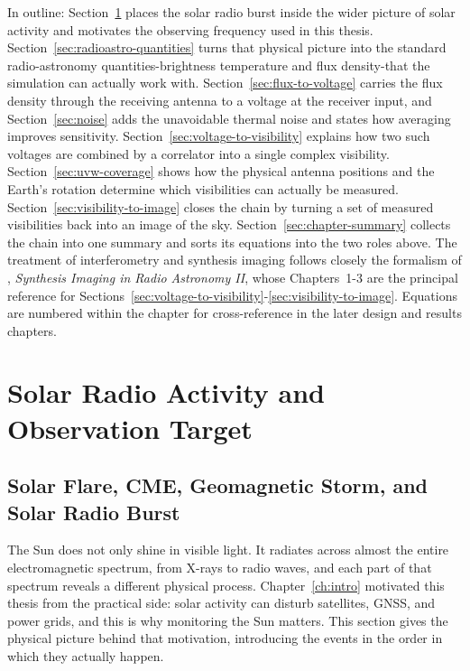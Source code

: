 In outline: Section~\ref{sec:solar-activity} places the solar radio burst
inside the wider picture of solar activity and motivates the observing
frequency used in this thesis. Section~\ref{sec:radioastro-quantities} turns
that physical picture into the standard radio-astronomy quantities-brightness
temperature and flux density-that the simulation can actually work with.
Section~\ref{sec:flux-to-voltage} carries the flux density through the
receiving antenna to a voltage at the receiver input, and
Section~\ref{sec:noise} adds the unavoidable thermal noise and states how
averaging improves sensitivity. Section~\ref{sec:voltage-to-visibility}
explains how two such voltages are combined by a correlator into a single
complex visibility. Section~\ref{sec:uvw-coverage} shows how the physical
antenna positions and the Earth's rotation determine which visibilities can
actually be measured. Section~\ref{sec:visibility-to-image} closes the chain
by turning a set of measured visibilities back into an image of the sky.
Section~\ref{sec:chapter-summary} collects the chain into one summary and
sorts its equations into the two roles above. The treatment of interferometry
and synthesis imaging follows closely the formalism of
\citet{taylor1999synthesis}, \emph{Synthesis Imaging in Radio Astronomy II},
whose Chapters~1-3 are the principal reference for
Sections~\ref{sec:voltage-to-visibility}-\ref{sec:visibility-to-image}.
Equations are numbered within the chapter for cross-reference in the later
design and results chapters.

\section{Solar Radio Activity and Observation Target}
\label{sec:solar-activity}

\subsection{Solar Flare, CME, Geomagnetic Storm, and Solar Radio Burst}
\label{subsec:flare-cme-storm}
The Sun does not only shine in visible light. It radiates across almost the
entire electromagnetic spectrum, from X-rays to radio waves, and each part of
that spectrum reveals a different physical process. Chapter~\ref{ch:intro}
motivated this thesis from the practical side: solar activity can disturb
satellites, GNSS, and power grids, and this is why monitoring the Sun matters.
This section gives the physical picture behind that motivation, introducing
the events in the order in which they actually happen.

